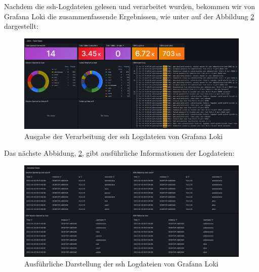 \newpage
{} 
\thispagestyle{lscape}
\begin{landscape}
   Nachdem die \gls{ssh}-Logdateien gelesen und verarbeitet wurden, bekommen wir von Grafana Loki die zusammenfassende Ergebnissen, wie unter auf der Abbildung \ref{fig:Grafana_DetailedStats} dargestellt:
    \begin{figure}[H]
        \centerline{\includegraphics[width=1.7\textwidth]{assets/GrafanaLoki_ssh}}
        \caption[Ausgabe der Verarbeitung der \gls{ssh} Logdateien von Grafana Loki]
        {Ausgabe der Verarbeitung der \gls{ssh} Logdateien von Grafana Loki}
        \label{fig:Grafana_Grafik}
        \centering
    \end{figure} 
\end{landscape}
\restoregeometry

\newpage
{} 
\thispagestyle{lscape}
\begin{landscape}
   Das nächste Abbidung, \ref{fig:Grafana_DetailedStats}, gibt ausführliche Informationen der Logdateien:
    \begin{figure}[H]
        \centerline{\includegraphics[width=1.7\textwidth]{assets/GrafanaLoki_sshDetailed.png}}
        \caption[Ausführliche Darstellung der \gls{ssh} Logdateien von Grafana Loki]
        {Ausführliche Darstellung der \gls{ssh} Logdateien von Grafana Loki}
        \label{fig:Grafana_DetailedStats}
        \centering
    \end{figure} 
\end{landscape}
\restoregeometry

